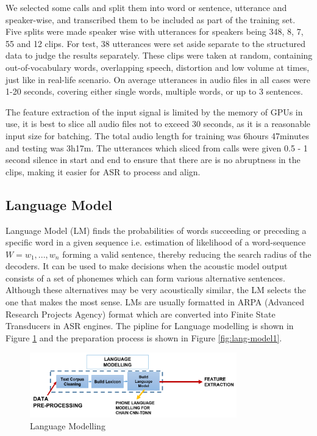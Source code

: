 \documentclass[3p,times]{elsarticle}
\begin{document}
We selected some calls and split them into word or sentence, utterance and speaker-wise, and transcribed them to be included as part of the training set. Five splits were made speaker wise with utterances for speakers being 348, 8, 7, 55 and 12 clips. For test, 38 utterances were set aside separate to the structured data to judge the results separately. These clips were taken at random, containing out-of-vocabulary words, overlapping speech, distortion and low volume at times, just like in real-life scenario. On average utterances in audio files in all cases were 1-20 seconds, covering either single words, multiple words, or up to 3 sentences.

 
The feature extraction of the input signal is limited by the memory of GPUs in use, it is best to slice all audio files not to exceed 30 seconds, as it is a reasonable input size for batching. The total audio length for training was 6hours 47minutes and testing was 3h17m. The utterances which sliced from calls were given 0.5 - 1 second silence in start and end to ensure that there are is no abruptness in the clips, making it easier for ASR to process and align.

\subsection{Language Model}
\label{sec:our_lang_modelling}

Language Model (LM) finds the probabilities of words succeeding or preceding a specific word in a given sequence i.e. estimation of likelihood of a word-sequence $W = w_{1},...,w_{n}$ forming a valid sentence, thereby reducing the search radius of the decoders. It can be used to make decisions when the acoustic model output consists of a set of phonemes which can form various alternative sentences. Although these alternatives may be very acoustically similar, the LM selects the one that makes the most sense. LMs are usually formatted in ARPA (Advanced Research Projects Agency) format which are converted into Finite State Transducers in ASR engines. The pipline for Language modelling is shown in Figure \ref{fig:working_pipeline-2} and the preparation process is shown in Figure \ref{fig:lang-model1}. 

\begin{figure}[h]
    \centering
    \includegraphics[width=0.8\textwidth]{img/workflow-2.png}
    \caption{Language Modelling}
    \label{fig:working_pipeline-2}
\end{figure}
\end{document}
